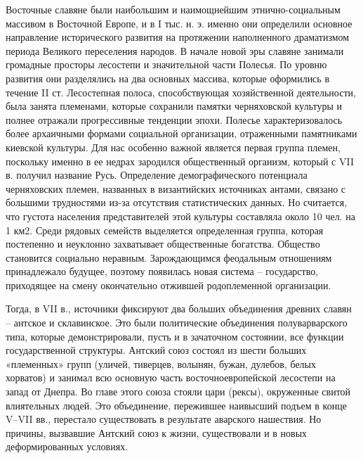Восточные славяне были наибольшим и наимощнейшим этнично-социальным массивом в
Восточной Европе, и в I тыс. н. э. именно они определили основное направление
исторического развития на протяжении наполненного драматизмом периода Великого
переселения народов. В начале новой эры славяне занимали громадные просторы
лесостепи и значительной части Полесья. По уровню развития они разделялись на
два основных массива, которые оформились в течение II ст. Лесостепная полоса,
способствующая хозяйственной деятельности, была занята племенами, которые
сохранили памятки черняховской культуры и полнее отражали прогрессивные
тенденции эпохи. Полесье характеризовалось более архаичными формами социальной
организации, отраженными памятниками киевской культуры. Для нас особенно важной
является первая группа племен, поскольку именно в ее недрах зародился
общественный организм, который с VII в. получил название Русь. Определение
демографического потенциала черняховских племен, названных в византийских
источниках антами, связано с большими трудностями из-за отсутствия
статистических данных. Но считается, что густота населения представителей этой
культуры составляла около 10 чел. на 1 км2. Среди рядовых семейств выделяется
определенная группа, которая постепенно и неуклонно захватывает общественные
богатства. Общество становится социально неравным. Зарождающимся феодальным
отношениям принадлежало будущее, поэтому появилась новая система – государство,
приходящее на смену окончательно отжившей родоплеменной организации.

Тогда, в VII в., источники фиксируют два больших объединения древних славян –
антское и склавинское. Это были политические объединения полуварварского типа,
которые демонстрировали, пусть и в зачаточном состоянии, все функции
государственной структуры. Антский союз состоял из шести больших «племенных»
групп (уличей, тиверцев, волынян, бужан, дулебов, белых хорватов) и занимал всю
основную часть восточноевропейской лесостепи на запад от Днепра. Во главе этого
союза стояли цари (рексы), окруженные свитой влиятельных людей. Это
объединение, пережившее наивысший подъем в конце V–VII вв., перестало
существовать в результате аварского нашествия. Но причины, вызвавшие Антский
союз к жизни, существовали и в новых деформированных условиях.
	
